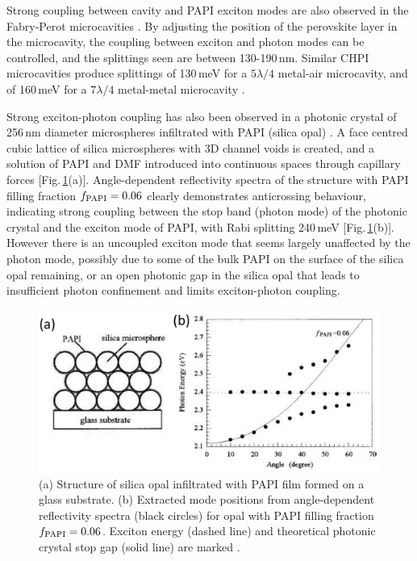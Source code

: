 Strong coupling between cavity and PAPI exciton modes are also observed in the Fabry-Perot microcavities \cite{Brehier2006, Lanty2008}. By adjusting the position of the perovskite layer in the microcavity, the coupling between exciton and photon modes can be controlled, and the splittings seen are between 130-190\,nm. Similar CHPI microcavities produce splittings of 130\,meV for a $5\lambda/4$ metal-air microcavity, and of 160\,meV for a $7\lambda/4$ metal-metal microcavity \cite{Pradeesh2009b}.

Strong exciton-photon coupling has also been observed in a photonic crystal of 256\,nm diameter microspheres infiltrated with PAPI (silica opal) \cite{Sumioka2001}. A face centred cubic lattice of silica microspheres with 3D channel voids is created, and a solution of PAPI and DMF introduced into continuous spaces through capillary forces [Fig.\,\ref{2Fig21}(a)]. Angle-dependent reflectivity spectra of the structure with PAPI filling fraction $f_{\textnormal{PAPI}}=0.06$ clearly demonstrates anticrossing behaviour, indicating strong coupling between the stop band (photon mode) of the photonic crystal and the exciton mode of PAPI, with Rabi splitting 240\,meV [Fig.\,\ref{2Fig21}(b)]. However there is an uncoupled exciton mode that seems largely unaffected by the photon mode, possibly due to some of the bulk PAPI on the surface of the silica opal remaining, or an open photonic gap in the silica opal that leads to insufficient photon confinement and limits exciton-photon coupling. 
\begin{figure}[h!]
\centering
\includegraphics[width=\textwidth]{Fig21}
\caption{(a) Structure of silica opal infiltrated with PAPI film formed on a glass substrate. (b) Extracted mode positions from angle-dependent reflectivity spectra (black circles) for opal with PAPI filling fraction $f_{\textnormal{PAPI}}=0.06$. Exciton energy (dashed line) and theoretical photonic crystal stop gap (solid line) are marked \cite{Sumioka2001}.}
\label{2Fig21}
\end{figure}


